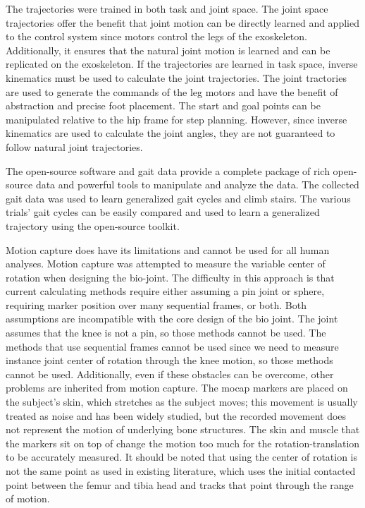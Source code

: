The trajectories were trained in both task and joint space. The joint space trajectories offer the benefit that joint motion can be directly learned and applied to the control system since motors control the legs of the exoskeleton. Additionally, it ensures that the natural joint motion is learned and can be replicated on the exoskeleton. If the trajectories are learned in task space, inverse kinematics must be used to calculate the joint trajectories. The joint tractories are used to generate the commands of the leg motors and have the benefit of abstraction and precise foot placement. The start and goal points can be manipulated relative to the hip frame for step planning. However, since inverse kinematics are used to calculate the joint angles, they are not guaranteed to follow natural joint trajectories.   

The open-source software and gait data provide a complete package of rich open-source data and powerful tools to manipulate and analyze the data. The collected gait data was used to learn generalized gait cycles and climb stairs. The various trials' gait cycles can be easily compared and used to learn a generalized trajectory using the open-source toolkit. 

Motion capture does have its limitations and cannot be used for all human analyses. Motion capture was attempted to measure the variable center of rotation when designing the bio-joint. The difficulty in this approach is that current calculating methods require either assuming a pin joint or sphere, requiring marker position over many sequential frames, or both. Both assumptions are incompatible with the core design of the bio joint. The joint assumes that the knee is not a pin, so those methods cannot be used. The methods that use sequential frames cannot be used since we need to measure instance joint center of rotation through the knee motion, so those methods cannot be used. Additionally, even if these obstacles can be overcome, other problems are inherited from motion capture. The mocap markers are placed on the subject's skin, which stretches as the subject moves; this movement is usually treated as noise and has been widely studied, but the recorded movement does not represent the motion of underlying bone structures. The skin and muscle that the markers sit on top of change the motion too much for the rotation-translation to be accurately measured. It should be noted that using the center of rotation is not the same point as used in existing literature, which uses the initial contacted point between the femur and tibia head and tracks that point through the range of motion.




